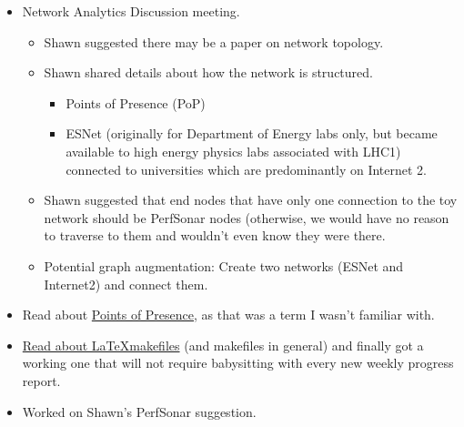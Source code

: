 \documentclass{weeklyreport}
\begin{document}
\begin{itemize}
    \item Network Analytics Discussion meeting.
    \begin{itemize}
    	\item Shawn suggested there may be a paper on network topology.
    	\item Shawn shared details about how the network is structured.
    	\begin{itemize}
    		\item Points of Presence (PoP)
    		\item ESNet (originally for Department of Energy labs only, but became available to high energy physics labs associated with LHC1) connected to universities which are predominantly on Internet 2.
    	\end{itemize}
    	\item Shawn suggested that end nodes that have only one connection to the toy network should be PerfSonar nodes (otherwise, we would have no reason to traverse to them and wouldn't even know they were there.
    	\item Potential graph augmentation: Create two networks (ESNet and Internet2) and connect them.
    \end{itemize}
    \item Read about \href{https://blog.stackpath.com/point-of-presence/}{Points of Presence}, as that was a term I wasn't familiar with.
    \item \href{https://blog.dbrgn.ch/2011/2/22/a-simple-latex-makefile/}{Read about \LaTeX  makefiles} (and makefiles in general) and finally got a working one that will not require babysitting with every new weekly progress report.
    \item Worked on Shawn's PerfSonar suggestion.
\end{itemize}



\subsection*{}
\end{document}
